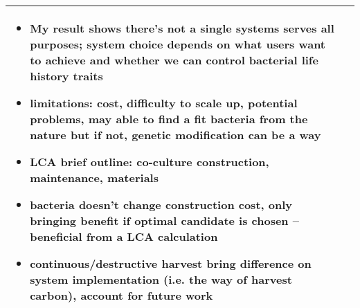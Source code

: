 \documentclass[a4paper,11pt]{article}
\begin{document}
\begin{longtable}{p{.2\linewidth}p{.7\linewidth}}
\begin{itemize}
        \item My result shows there's not a single systems serves all purposes; system choice depends on what users want to achieve and whether we can control bacterial life history traits
        \item limitations: cost, difficulty to scale up, potential problems, may able to find a fit bacteria from the nature but if not, genetic modification can be a way
        \item LCA brief outline: co-culture construction, maintenance, materials
        \item bacteria doesn't change construction cost, only bringing benefit if optimal candidate is chosen -- beneficial from a LCA calculation
        \item continuous/destructive harvest bring difference on system implementation (i.e. the way of harvest carbon), account for future work
    \end{itemize}\\
    \hline\end{longtable}
    
\end{document}
